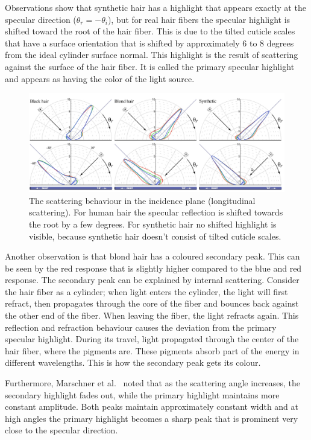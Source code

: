 \documentclass[11pt,a4paper]{report}
\begin{document}
Observations show that synthetic hair has a highlight that appears exactly at the specular direction ($\theta_r = -\theta_i$), but for real hair fibers the specular highlight is shifted toward the root of the hair fiber. This is due to the tilted cuticle scales that have a surface orientation that is shifted by approximately 6 to 8 degrees from the ideal cylinder surface normal. This highlight is the result of scattering against the surface of the hair fiber. It is called the primary specular highlight and appears as having the color of the light source.

\begin{figure}[h]
\begin{center}
\includegraphics[scale=0.35]{images/longitudinal_response.jpeg}
\caption{The scattering behaviour in the incidence plane (longitudinal scattering). For human hair the specular reflection is shifted towards the root by a few degrees. For synthetic hair no shifted highlight is visible, because synthetic hair doesn't consist of tilted cuticle scales.}
\label{fig_longitudinal_marschner}
\end{center}
\end{figure}

Another observation is that blond hair has a coloured secondary peak. This can be seen by the red response that is slightly higher compared to the blue and red response. The secondary peak can be explained by internal scattering. Consider the hair fiber as a cylinder; when light enters the cylinder, the light will first refract, then propagates through the core of the fiber and bounces back against the other end of the fiber. When leaving the fiber, the light refracts again. This reflection and refraction behaviour causes the deviation from the primary specular highlight. During its travel, light propagated through the center of the hair fiber, where the pigments are. These pigments absorb part of the energy in different wavelengths. This is how the secondary peak gets its colour.

Furthermore, Marschner et al.~\cite{marschner} noted that as the scattering angle increases, the secondary highlight fades out, while the primary highlight maintains more constant amplitude. Both peaks maintain approximately constant width and at high angles the primary highlight becomes a sharp peak that is prominent very close to the specular direction. 
\end{document}
